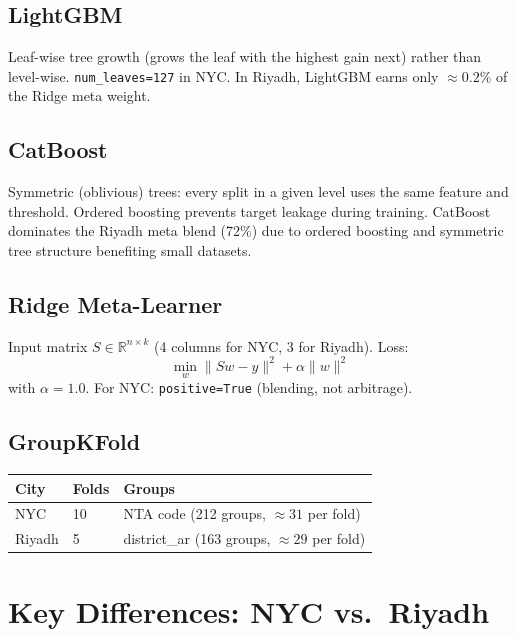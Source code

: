 \documentclass[11pt, a4paper, twoside]{report}
\begin{document}
\section{LightGBM}
Leaf-wise tree growth (grows the leaf with the highest gain next) rather than
level-wise. \texttt{num\_leaves=127} in NYC. In Riyadh, LightGBM earns only
$\approx 0.2\%$ of the Ridge meta weight.

\section{CatBoost}
Symmetric (oblivious) trees: every split in a given level uses the same feature
and threshold. Ordered boosting prevents target leakage during training. CatBoost
dominates the Riyadh meta blend (72\%) due to ordered boosting and symmetric tree
structure benefiting small datasets.

\section{Ridge Meta-Learner}
Input matrix $S \in \mathbb{R}^{n \times k}$ (4 columns for NYC, 3 for Riyadh).
Loss:
\[
  \min_w \|Sw - y\|^2 + \alpha\|w\|^2
\]
with $\alpha = 1.0$. For NYC: \texttt{positive=True} (blending, not arbitrage).

\section{GroupKFold}
\begin{table}[H]
  \centering
  \begin{tabular}{lll}
    \toprule
    City & Folds & Groups \\
    \midrule
    NYC    & 10 & NTA code (212 groups, $\approx 31$ per fold) \\
    Riyadh & 5  & district\_ar (163 groups, $\approx 29$ per fold) \\
    \bottomrule
  \end{tabular}
\end{table}

\chapter{Key Differences: NYC vs.\ Riyadh}
\label{ch:differences}
\end{document}
